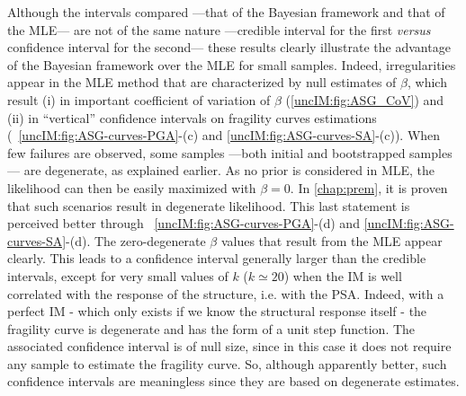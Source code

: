   Although the intervals compared ---that of the Bayesian framework and that of the MLE--- are not of the same nature ---credible interval for the first \emph{versus} confidence interval for the second--- these results clearly illustrate the advantage of the Bayesian framework over the MLE for small samples. Indeed, irregularities appear in the MLE method that are characterized by null estimates of $\beta$, which result (i) in important coefficient of variation of $\beta$  (\cref{uncIM:fig:ASG_CoV}) and (ii) in ``vertical'' confidence intervals on fragility curves estimations (~\ref{uncIM:fig:ASG-curves-PGA}-(c) and \ref{uncIM:fig:ASG-curves-SA}-(c)). {When few failures are observed, some samples ---both initial and bootstrapped samples--- are degenerate, as explained earlier.} As no prior is considered in MLE, the likelihood can then be easily maximized with $\beta=0$. In \cref{chap:prem}, it is proven that such scenarios result in degenerate likelihood. This last statement is perceived better through ~\ref{uncIM:fig:ASG-curves-PGA}-(d) and \ref{uncIM:fig:ASG-curves-SA}-(d). The zero-degenerate $\beta$ values that result from the MLE appear clearly. This leads to a confidence interval generally larger than the credible intervals, except for very small values of $k$ ($k \simeq 20$) when the IM is well correlated with the response of the structure, i.e. with the PSA. Indeed, with a perfect IM - which only exists if we know the structural response itself - the fragility curve is degenerate and has the form of a unit step function. The associated confidence interval is of null size, since in this case it does not require any sample to estimate the fragility curve. So, although apparently better, such confidence intervals are meaningless since they are based on degenerate estimates.
  

  
          
